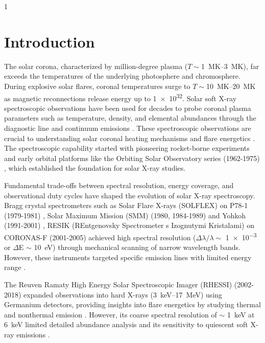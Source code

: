\documentclass[12pt]{spieman}  %
\begin{document}
\begin{spacing}{1}   %

\section{Introduction}
\label{sect:intro}  %
The solar corona, characterized by million-degree plasma ($T \sim $\SIrange{1}{3}{\mega\kelvin}), far exceeds the temperatures of the underlying photosphere and chromosphere. 
During explosive solar flares, coronal temperatures surge to $T \sim $\SIrange{10}{20}{\mega\kelvin} as magnetic reconnections release energy up to \SI{1e32}{\erg}\cite{Shibata2011}. 
Solar soft X-ray spectroscopic observations have been used for decades to probe coronal plasma parameters such as temperature, density, and elemental abundances through the diagnostic line and continuum emissions \cite{delzannaSolarUVXray2018}.
These spectroscopic observations are crucial to understanding solar coronal heating mechanisms and flare energetics \cite{Parker1988,Klimchuk2006,Aschwanden2015}. The spectroscopic capability started with pioneering rocket-borne experiments \cite{Friedman1951,blake1964solar} and early orbital platforms like the Orbiting Solar Observatory series (1962-1975) \cite{Walker1972,Neupert1971}, which established the foundation for solar X-ray studies.

Fundamental trade-offs between spectral resolution, energy coverage, and observational duty cycles have shaped the evolution of solar X-ray spectroscopy. Bragg crystal spectrometers such as Solar Flare X-rays (SOLFLEX) on P78-1 (1979-1981) \cite{Doscheck1981}, Solar Maximum Mission (SMM) (1980, 1984-1989) \cite{ActonSMMXRP1980} and Yohkoh (1991-2001) \cite{CulhaneYohkohBCS1991}, RESIK (REntgenovsky Spectrometer s Izognutymi Kristalami) on CORONAS-F (2001-2005) \cite{Sylwester2005} achieved high spectral resolution ($\Delta\lambda/\lambda \sim$ \num{1e-3} or $\Delta$E $\sim$ \SI{10}{\electronvolt}) through mechanical scanning of narrow wavelength bands. However, these instruments targeted specific emission lines with limited energy range \cite{Phillips2004b}. 
	


The Reuven Ramaty High Energy Solar Spectroscopic Imager (RHESSI) (2002-2018) \cite{Lin2002} expanded observations into hard X-rays (\SI{3}{\keV}--\SI{17}{\mega\electronvolt}) using Germanium detectors, providing insights into flare energetics by studying thermal and nonthermal emission \cite{SaintHilaire2005,Aschwanden2016,Warmuth2016}. However, its coarse spectral resolution of $\sim$ \SI{1}{\keV} at \SI{6}{\keV} limited detailed abundance analysis \cite{Phillips2012} and its sensitivity to quiescent soft X-ray emissions \cite{McTiernan2009}.



\end{spacing}
\end{document}
